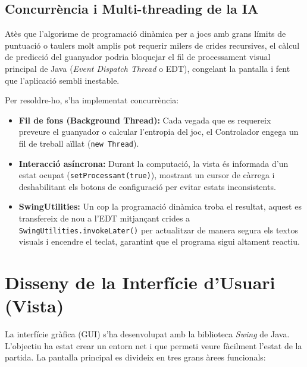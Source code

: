 \documentclass[compsoc, a4paper]{IEEEtran}
\begin{document}
\subsection{Concurrència i Multi-threading de la IA}

Atès que l'algorisme de programació dinàmica per a jocs amb grans límits de puntuació o taulers molt amplis pot requerir milers de crides recursives, el càlcul de predicció del guanyador podria bloquejar el fil de processament visual principal de Java (\textit{Event Dispatch Thread} o EDT), congelant la pantalla i fent que l'aplicació sembli inestable. 

Per resoldre-ho, s'ha implementat concurrència:
\begin{itemize}
    \item \textbf{Fil de fons (Background Thread):} Cada vegada que es requereix preveure el guanyador o calcular l'entropia del joc, el Controlador engega un fil de treball aïllat (\texttt{new Thread}).
    \item \textbf{Interacció asíncrona:} Durant la computació, la vista és informada d'un estat ocupat (\texttt{setProcessant(true)}), mostrant un cursor de càrrega i deshabilitant els botons de configuració per evitar estats inconsistents.
    \item \textbf{SwingUtilities:} Un cop la programació dinàmica troba el resultat, aquest es transfereix de nou a l'EDT mitjançant crides a \texttt{SwingUtilities.invokeLater()} per actualitzar de manera segura els textos visuals i encendre el teclat, garantint que el programa sigui altament reactiu.
\end{itemize}

\section{Disseny de la Interfície d'Usuari (Vista)}

La interfície gràfica (GUI) s'ha desenvolupat amb la biblioteca \textit{Swing} de Java. L'objectiu ha estat crear un entorn net i que permeti veure fàcilment l'estat de la partida. La pantalla principal es divideix en tres grans àrees funcionals:
\end{document}
